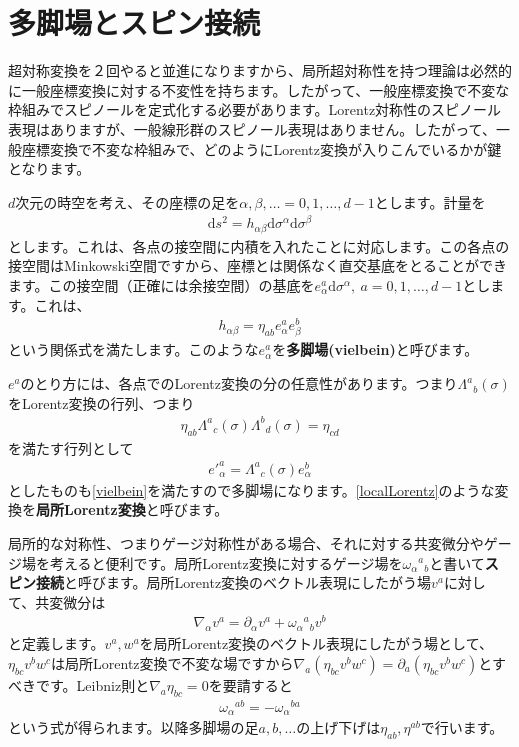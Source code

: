 \documentclass[report,paper=a4, fontsize=12pt, line_length=16cm, number_of_lines=33,dvipdfmx]{jlreq}
\numberwithin{equation}{chapter}
\numberwithin{equation}{section}
\newcommand{\del}{\partial}
\newcommand{\kyou}[1]{{\sffamily \bfseries #1}}
\newcommand{\di}{\mathrm{d}}
\begin{document}
\section{多脚場とスピン接続}
超対称変換を２回やると並進になりますから、局所超対称性を持つ理論は必然的に一般座標変換に対する不変性を持ちます。したがって、一般座標変換で不変な枠組みでスピノールを定式化する必要があります。Lorentz対称性のスピノール表現はありますが、一般線形群のスピノール表現はありません。したがって、一般座標変換で不変な枠組みで、どのようにLorentz変換が入りこんでいるかが鍵となります。

$d$次元の時空を考え、その座標の足を$\alpha,\beta,\dots=0,1,\dots,d-1$とします。計量を
\begin{align}
  \di s^2 = h_{\alpha\beta} \di \sigma^{\alpha}\di \sigma^{\beta}
\end{align}
とします。これは、各点の接空間に内積を入れたことに対応します。この各点の接空間はMinkowski空間ですから、座標とは関係なく直交基底をとることができます。この接空間（正確には余接空間）の基底を$e^{a}_{\alpha}\di \sigma^{\alpha}, \ a=0,1,\dots,d-1$とします。これは、
\begin{align}
  h_{\alpha\beta}=\eta_{ab}e^{a}_{\alpha}e^{b}_{\beta}\label{vielbein}
\end{align}
という関係式を満たします。このような$e^{a}_{\alpha}$を\kyou{多脚場(vielbein)}と呼びます。

$e^{a}$のとり方には、各点でのLorentz変換の分の任意性があります。つまり$\Lambda^{a}{}_{b}(\sigma)$をLorentz変換の行列、つまり
\begin{align}
  \eta_{ab}\Lambda^{a}{}_{c}(\sigma)\Lambda^{b}{}_{d}(\sigma)=\eta_{cd}
\end{align}
を満たす行列として
\begin{align}
  e'^{a}_{\alpha}=\Lambda^{a}{}_{c}(\sigma)e^{b}_{\alpha}
  \label{localLorentz}
\end{align}
としたものも\eqref{vielbein}を満たすので多脚場になります。\eqref{localLorentz}のような変換を\kyou{局所Lorentz変換}と呼びます。

局所的な対称性、つまりゲージ対称性がある場合、それに対する共変微分やゲージ場を考えると便利です。局所Lorentz変換に対するゲージ場を$\omega_{\alpha}{}^{a}{}_{b}$と書いて\kyou{スピン接続}と呼びます。局所Lorentz変換のベクトル表現にしたがう場$v^{a}$に対して、共変微分は
\begin{align}
  \nabla_{\alpha}v^{a}=\del_{\alpha}v^{a}+\omega_{\alpha}{}^{a}{}_{b}v^{b}
\end{align}
と定義します。$v^{a},w^{a}$を局所Lorentz変換のベクトル表現にしたがう場として、$\eta_{bc}v^{b}w^{c}$は局所Lorentz変換で不変な場ですから$\nabla_{a}(\eta_{bc}v^{b}w^{c})=\del_{a}(\eta_{bc}v^{b}w^{c})$とすべきです。Leibniz則と$\nabla_{a}\eta_{bc}=0$を要請すると
\begin{align}
  \omega_{\alpha}{}^{ab}
  =-\omega_{\alpha}{}^{ba}
\end{align}
という式が得られます。以降多脚場の足$a,b,\dots$の上げ下げは$\eta_{ab},\eta^{ab}$で行います。
\end{document}

